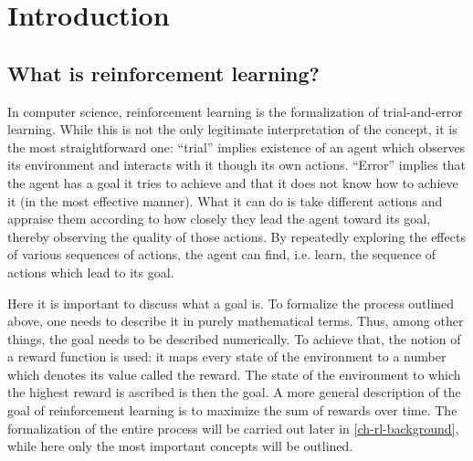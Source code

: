 \chapter{Introduction}
\label{ch-introduction}
\section{What is reinforcement learning?}
\label{sec-what-is-rl}
In computer science, reinforcement learning is the formalization of trial-and-error learning.
While this is not the only legitimate interpretation of the concept, it is the most straightforward one:
``trial'' implies existence of an agent which observes its environment and interacts with it 
though its own actions.
``Error'' implies that the agent has a goal it tries to achieve and
that it does not know how to achieve it (in the most effective manner). 
What it can do is take different actions and appraise them
according to how closely they lead the agent toward its goal, thereby observing
the quality of those actions.
By repeatedly exploring the effects of various sequences of actions, the agent
can find, i.e. learn, the sequence of actions which lead to its goal.

Here it is important to discuss what a goal is.
To formalize the process outlined above, one needs to describe it
in purely mathematical terms.
Thus, among other things, the goal needs to be described numerically.
To achieve that, the notion of a reward function is used:
it maps every state of the environment to a number which denotes
its value called the reward. 
The state of the environment to which the highest reward is ascribed
is then the goal.
A more general description of the goal of reinforcement learning
is to maximize the sum of rewards over time.
The formalization of the entire process will be carried out later in \ref{ch-rl-background},
while here only the most important concepts will be outlined.


